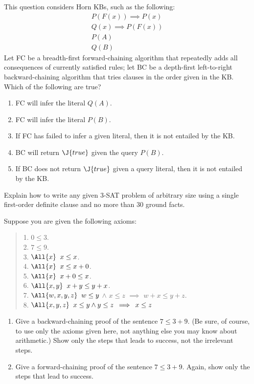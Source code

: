 \begin{iexercise}%
This question considers Horn KBs, such as the following:
\[\begin{array}{l}
P(F(x)) \implies P(x)\\
Q(x) \implies P(F(x))\\
P(A)\\
Q(B)
\end{array}\]
Let FC be a breadth-first forward-chaining algorithm
that repeatedly adds all consequences of currently satisfied rules;
let BC be a depth-first left-to-right backward-chaining algorithm
that tries clauses in the order given in the KB. Which of the following are true?
\begin{enumerate}
\item FC will infer the literal \(Q(A)\).
\item FC will infer the literal \(P(B)\).
\item If FC has failed to infer a given literal, then it is not entailed by the KB.
\item BC will return \(\J{true}\) given the query \(P(B)\).
\item If BC does not return \(\J{true}\) given a query literal, then it is not entailed by the KB.
\end{enumerate}
\end{iexercise} 

\begin{exercise}%
Explain how to write any given 3-SAT problem
of arbitrary size using a single first-order definite clause
and no more than 30 ground facts.
\end{exercise} 

\begin{uexercise}
Suppose you are given the following axioms:
\begin{quote}
1. $0 \leq 3$. \\
2. $7 \leq 9$. \\
3. $\All{x} \; \; x \leq x$. \\
4. $\All{x} \; \; x \leq x+0$. \\
5. $\All{x} \; \; x+0 \leq x$. \\
6. $\All{x,y} \; \; x+y \leq y+x$. \\
7. $\All {w,x,y,z} \; \; w \leq y$ $\wedge$ $x \leq z$ $\implies$ $w+x \leq y+z$.
\\
8. $\All{x,y,z} \; \; x \leq y \wedge y \leq z \: \implies \: x \leq z$
\end{quote}
\begin{enumerate}
\item Give a backward-chaining proof of the sentence $7 \leq 3+9$.
(Be sure, of course, to use only the axioms given here, not anything else
you may know about arithmetic.)  Show only the steps that leads to success,
not the irrelevant steps.
\item Give a forward-chaining proof of the sentence $7 \leq 3+9$.
Again, show only the steps that lead to success.\end{enumerate}
\end{uexercise} 

